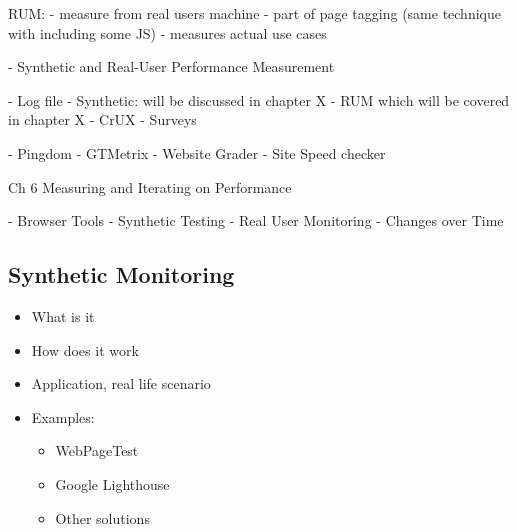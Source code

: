 RUM:
- measure from real users machine
- part of page tagging (same technique with including some JS)
- measures actual use cases



- Synthetic and Real-User Performance Measurement



- Log file
- Synthetic: will be discussed in chapter X
- RUM which will be covered in chapter X
- CrUX
- Surveys


- Pingdom
- GTMetrix
- Website Grader
- Site Speed checker












Ch 6 Measuring and Iterating on Performance

- Browser Tools
- Synthetic Testing
- Real User Monitoring
- Changes over Time















\subsection{Synthetic Monitoring}

\begin{itemize}
    \item What is it
    \item How does it work
    \item Application, real life scenario
    \item Examples:
    \begin{itemize}
        \item WebPageTest
        \item Google Lighthouse
        \item Other solutions
    \end{itemize}
\end{itemize}













